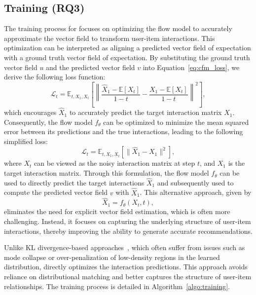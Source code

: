 \documentclass[sigconf]{acmart}
\begin{document}
\subsection{Training \ours (RQ3)}
The training process for \ours focuses on optimizing the flow model to accurately approximate the vector field to transform user-item interactions. This optimization can be interpreted as aligning a predicted vector field of expectation with a ground truth vector field of expectation. By substituting the ground truth vector field $u$ and the predicted vector field $v$ into Equation~\ref{eq:cfm_loss}, we derive the following loss function:
\begin{equation}
    \mathcal L_t = \mathbb{E}_{t, X_1, X_t} \left[\left\|\frac{\hat X_1 - \mathbb E[X_t]}{1 - t} - \frac{X_1 - \mathbb E[X_t]}{1 - t}\right\|^2 \right],
\end{equation}
which encourages $\hat X_1$ to accurately predict the target interaction matrix $X_1$.
Consequently, the flow model $f_\theta$ can be optimized to minimize the mean squared error between its predictions and the true interactions, leading to the following simplified loss:
\begin{equation}
\label{eq:our_loss}
	\mathcal{L}_t = \mathbb{E}_{t, X_1, X_t} \left[\|\hat X_1 - X_1\|^2 \right],
\end{equation}
where $X_t$ can be viewed as the noisy interaction matrix at step $t$, and $X_1$ is the target interaction matrix. Through this formulation, the flow model $f_\theta$ can be used to directly predict the target interactions $\hat X_1$ and subsequently used to compute the predicted vector field $v$ with $\hat X_1$. This alternative approach, given by
\begin{equation}
    \hat X_1 = f_\theta(X_t, t),
\end{equation}
eliminates the need for explicit vector field estimation, which is often more challenging. Instead, it focuses on capturing the underlying structure of user-item interactions, thereby improving the ability to generate accurate recommendations.

Unlike KL divergence-based approaches~\cite{liang2018variational, ma2019learning,shenbin2020recvae}, which often suffer from issues such as mode collapse or over-penalization of low-density regions in the learned distribution, \ours directly optimizes the interaction predictions. This approach avoids reliance on distributional matching and better captures the structure of user-item relationships. The training process is detailed in Algorithm~\ref{algo:training}.
\end{document}
